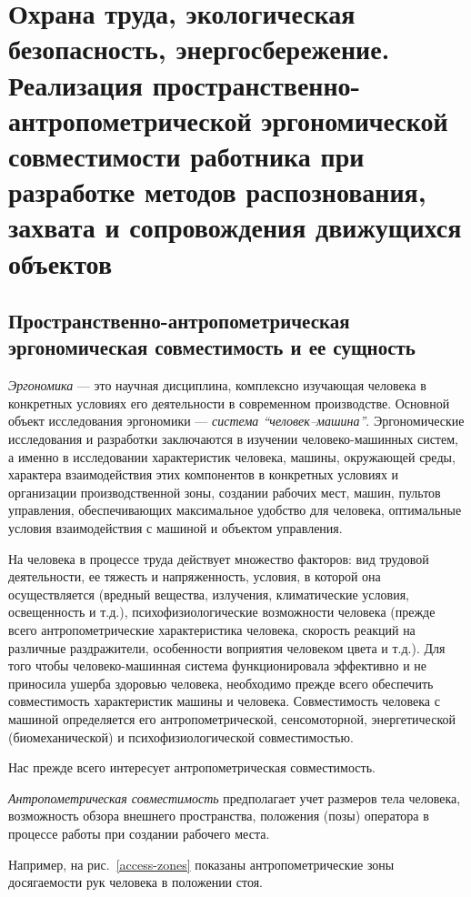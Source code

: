 \section{Охрана труда, экологическая безопасность, энергосбережение. Реализация пространственно\hyp{}антропометрической эргономической совместимости работника при разработке методов распознования, захвата и сопровождения движущихся объектов}

\subsection{Пространственно-антропометрическая эргономическая совместимость и ее сущность}
\emph{Эргономика} --- это научная дисциплина, комплексно изучающая человека в конкретных условиях его деятельности в современном производстве. Основной объект исследования эргономики --- \emph{система ``человек--машина''}. Эргономические исследования и разработки заключаются в изучении человеко-машинных систем, а именно в исследовании характеристик человека, машины, окружающей среды, характера взаимодействия этих компонентов в конкретных условиях и организации производственной зоны, создании рабочих мест, машин, пультов управления, обеспечивающих максимальное удобство для человека, оптимальные условия взаимодействия с машиной и объектом управления.\cite{devisilov09}

На человека в процессе труда действует множество факторов: вид трудовой деятельности, ее тяжесть и напряженность, условия, в которой она осуществляется (вредный вещества, излучения, климатические условия, освещенность и т.д.), психофизиологические возможности человека (прежде всего антропометрические характеристика человека, скорость реакций на различные раздражители, особенности воприятия человеком цвета и т.д.). Для того чтобы человеко-машинная система функционировала эффективно и не приносила ушерба здоровью человека, необходимо прежде всего обеспечить совместимость характеристик машины и человека. Совместимость человека с машиной определяется его антропометрической, сенсомоторной, энергетической (биомеханической) и психофизиологической совместимостью.\cite{devisilov09}

Нас прежде всего интересует антропометрическая совместимость.

\emph{Антропометрическая совместимость} предполагает учет размеров тела человека, возможность обзора внешнего пространства, положения (позы) оператора в процессе работы при создании рабочего места.\cite{devisilov09}

Например, на рис.~\ref{access-zones} показаны антропометрические зоны досягаемости рук человека в положении стоя.

